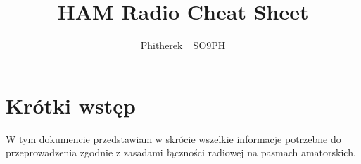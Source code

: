 \documentclass[a4paper,11pt]{article}
\author{Phitherek\_ SO9PH}
\title{HAM Radio Cheat Sheet}
\begin{document}
\maketitle
\section{Krótki wstęp}
W tym dokumencie przedstawiam w skrócie wszelkie informacje potrzebne do przeprowadzenia zgodnie z zasadami łączności radiowej na pasmach amatorskich.
\end{document}
